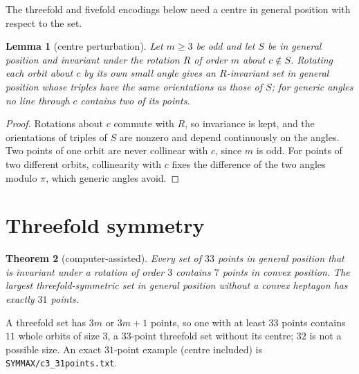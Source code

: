 \documentclass[11pt]{article}
\newtheorem{theorem}{Theorem}
\newtheorem{lemma}[theorem]{Lemma}
\theoremstyle{remark}
\begin{document}
The threefold and fivefold encodings below need a centre in general position with respect to the set.
\begin{lemma}[centre perturbation]\label{lem:perturb}
Let $m\ge3$ be odd and let $S$ be in general position and invariant under the rotation $R$ of order $m$ about $c\notin S$.
Rotating each orbit about $c$ by its own small angle gives an $R$-invariant set in general position whose triples have the
same orientations as those of $S$; for generic angles no line through $c$ contains two of its points.
\end{lemma}
\begin{proof}
Rotations about $c$ commute with $R$, so invariance is kept, and the orientations of triples of $S$ are nonzero and depend
continuously on the angles. Two points of one orbit are never collinear with $c$, since $m$ is odd. For points of two
different orbits, collinearity with $c$ fixes the difference of the two angles modulo $\pi$, which generic angles avoid.
\end{proof}

\section{Threefold symmetry}
\begin{theorem}[computer-assisted]\label{thm:A}
Every set of $33$ points in general position that is invariant under a rotation of order $3$ contains $7$ points in convex
position. The largest threefold-symmetric set in general position without a convex heptagon has exactly $31$ points.
\end{theorem}
A threefold set has $3m$ or $3m+1$ points, so one with at least $33$ points contains $11$ whole orbits of size $3$, a
$33$-point threefold set without its centre; $32$ is not a possible size. An exact $31$-point example (centre included)
is \texttt{SYMMAX/c3\_31points.txt}.
\end{document}
